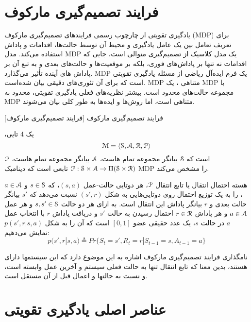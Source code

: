\section{فرایند تصمیم‌گیری مارکوف}

یادگیری تقویتی از چارچوب رسمی فرایندهای تصمیم‌گیری مارکوف (MDP) برای تعریف تعامل بین یک عامل یادگیری و محیط آن توسط حالت‌ها، اقدامات و پاداش استفاده می‌کند. مدل MDP یک مدل کلاسیک از تصمیم‌گیری متوالی است، جایی که اقدامات نه تنها بر پاداش‌های فوری، بلکه بر موقعیت‌ها و حالت‌های بعدی و به تبع آن بر پاداش های آینده تأثیر می‌گذارد.
MDP
 یک فرم ایده‌آل ریاضی از مسئله یادگیری تقویتی است که برای آن تئوری‌های دقیقی بیان شده‌است.
MDP متناهی ، یک MDP با مجموعه حالت‌های محدود است. 
بیشتر نظریه‌های فعلی یادگیری تقویتی، محدود به MDP متناهی است، اما روش‌ها و ایده‌ها به طور کلی بیان می‌شوند.


[فرایند تصمیم‌گیری مارکوف] 
 فرایند تصمیم‌گیری مارکوف

،یک 4 تایی 
$$\EuScript{M} = \left< \EuScript{S},\EuScript{A},\EuScript{R},\EuScript{P} \right>$$
است که
 $\EuScript{S}$ بیانگر مجموعه تمام \nf هاست،
 $\EuScript{A}$ بیانگر مجموعه تمام \nf هاست،
$\EuScript{P}$
$ \EuScript{P}: \EuScript{S} \times \EuScript{A} \to \Pi(\EuScript{S} \times \EuScript{R})$
تابعی است که دینامیک MDP را مشخص می‌کند.


هسته احتمال انتقال یا تابع انتقال $\EuScript{P}$، هر دوتایی حالت-عمل
$(s,a)$، که 
$s \in \EuScript{S}$
و
$a \in \EuScript{A}$، را به یک توزیع احتمال روی دوتایی‌هایی به شکل 
$(s',r)$
نسبت می‌دهد که $s'$ بیانگر حالت بعدی و $r$ بیانگر پاداش این انتقال است. به ازای هر دو حالت 
$s,s' \in \EuScript{S}$
 و هر عمل 
 $a \in \EuScript{A}$
  و هر پاداش 
  $r \in \EuScript{R}$
  احتمال رسیدن به حالت $s'$ و دریافت پاداش $r$ با انتخاب عمل $a$ در حالت $s$، یک عدد حقیقی عضو $[0,1]$ است که آن را به شکل
$p(s',r|s,a)$
نمایش می‌دهیم:
$$p(s',r|s,a) \triangleq Pr\{S_t=s',R_t=r|S_{t-1}=s,A_{t-1}=a\}$$

نامگذاری فرایند تصمیم‌گیری مارکوف اشاره به این موضوع دارد که این سیستم\nf ها دارای  هستند، بدین معنا که تابع انتقال تنها به حالت فعلی سیستم و آخرین عمل وابسته است، و نسبت به حالت\nf ها و اعمال قبل از آن مستقل است.
\section{عناصر اصلی یادگیری تقویتی}
